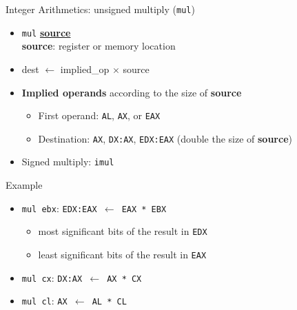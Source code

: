 \documentclass[]{beamer}
\begin{document}
\begin{frame}{Integer Arithmetics: unsigned multiply ({\tt mul})}
  \begin{itemize}
  \item{{\tt mul} \underline{\textbf{source}}}\\
    \textbf{source}: register or memory location
  \item dest $\leftarrow$ implied\_op $\times$ source
  \item \textbf{Implied operands} according to the size of \textbf{source}
  	\begin{itemize}
  		\item First operand: {\tt AL}, {\tt AX}, or {\tt EAX}
  		\item Destination: {\tt AX}, {\tt DX:AX}, {\tt EDX:EAX} (double the size of \textbf{source})
  	\end{itemize}
  \item Signed multiply: {\tt imul}
  \end{itemize}

  \begin{block}{Example}
	  \begin{itemize}
	  	\item {\tt mul ebx}: {\tt EDX:EAX $\leftarrow$ EAX * EBX}
	  	\begin{itemize}
	  		\item most significant bits of the result in {\tt EDX}
	  		\item least significant bits of the result in {\tt EAX}
	  	\end{itemize}
	  	\item {\tt mul cx}: {\tt DX:AX $\leftarrow$ AX * CX}
	  	\item {\tt mul cl}: {\tt AX $\leftarrow$ AL * CL}
	  \end{itemize}
  \end{block}
\end{frame}
\end{document}
